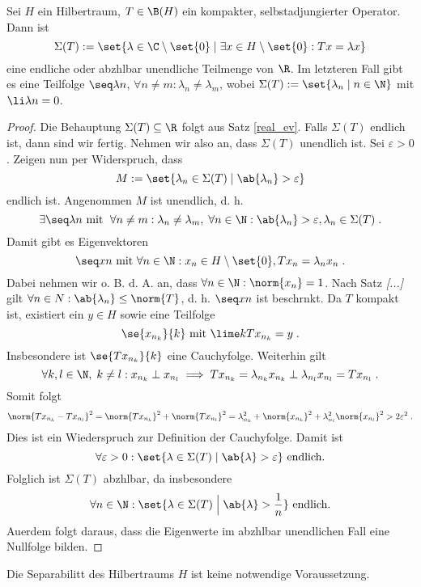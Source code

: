 \begin{theorem}
	Sei $H$ ein Hilbertraum, \(T\in \B(H)\) ein kompakter, selbstadjungierter Operator. Dann ist 
	\[\Sigma(T):= \set{\lambda \in \C\setminus \set{0} \;\vert\; \exists x \in H\setminus\set{0}: Tx = \lambda x}\]
	eine endliche oder abz\as hlbar unendliche Teilmenge von \(\R\). Im letzteren Fall gibt es eine Teilfolge \(\seq \lambda n \), \(\forall n\neq m: \lambda_n \neq \lambda_m\), wobei \(\Sigma(T) := \set{\lambda_n \;\vert\; n\in\N }\) mit \(\li \lambda n = 0\).
	\label{spec_comp_pre_1}
\end{theorem}
\begin{proof}
	\happybegin
	Die Behauptung \(\Sigma(T) \subseteq \R\) folgt aus Satz \ref{real_ev}.
	Falls \(\Sigma(T)\) endlich ist, dann sind wir fertig. Nehmen wir also an, dass \(\Sigma(T)\) unendlich ist. Sei \(\varepsilon > 0\). Zeigen nun per Widerspruch, dass \[M := \set{\lambda_n\in \Sigma(T)\;\vert\; \ab{\lambda_n} > \varepsilon}\] endlich ist. Angenommen $M$ ist unendlich, d. h. 
	\[\exists \seq \lambda n\text{ mit }\;\forall n\neq m: \lambda_n \neq \lambda_m,\;\forall n\in\N: \ab{\lambda_n}> \varepsilon, \lambda_n \in \Sigma(T)\;.\]
	Damit gibt es Eigenvektoren
	\[\seq xn \text{ mit } \forall n\in\N: x_n \in H\setminus\set{0}, Tx_n = \lambda_n x_n\;.\]
	Dabei nehmen wir o. B. d. A. an, dass \(\forall n\in\N: \norm{x_n} = 1\).  Nach Satz \textit{[...]} gilt \(\forall n \in N: \ab{\lambda_n} \leq \norm{T}\), d. h. $\seq xn$ ist beschr\as nkt. Da $T$ kompakt ist, existiert  ein \(y\in H\) sowie eine Teilfolge 
	\[\se{x_{n_k}}{k} \text{ mit } \lime k Tx_{n_k} = y \;.\]
	Insbesondere ist \(\se{Tx_{n_k}}{k}\) eine Cauchyfolge. Weiterhin gilt
	\[\forall k,l\in\N,\; k\neq l: x_{n_k} \perp x_{n_l}\implies Tx_{n_k}  = \lambda_{n_k} x_{n_k}\perp \lambda_{n_l} x_{n_l} = Tx_{n_l}\;.\]
	Somit folgt 
	\[\norm{Tx_{n_k} - Tx_{n_l}}^2 = \norm{Tx_{n_k}}^2 + \norm{Tx_{n_l}}^2 =  \lambda_{n_k}^2 + \norm{x_{n_k}}^2+ \lambda_{n_l}^2 \norm{x_{n_l}}^2  > 2\varepsilon^2\;.\]
	Dies ist ein Wiederspruch zur Definition der Cauchyfolge. Damit ist 
	\[\forall \varepsilon > 0: \set{\lambda \in \Sigma(T)\;\vert\; \ab{\lambda}> \varepsilon} \text{ endlich.}\]
	Folglich ist \(\Sigma(T)\) abz\as hlbar, da insbesondere 
	\[\forall n \in \N: \set{\lambda \in \Sigma(T)\;\Big\vert\; \ab{\lambda}> \frac{1}{n}} \text{ endlich.} \]
	Au\s erdem folgt daraus, dass die Eigenwerte im abz\as hlbar unendlichen Fall eine Nullfolge bilden. \happyend
\end{proof}
\begin{rem}
	Die Separabilit\as t des Hilbertraums $H$ ist keine notwendige Voraussetzung. 
\end{rem}

